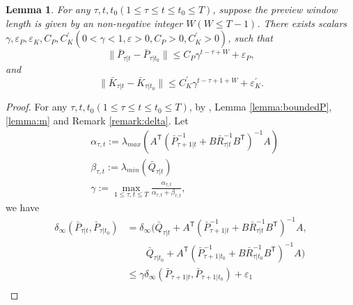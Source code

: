 \documentclass{article}
\newcommand{\transpose}{\mathsf{T}}
\newtheorem{lemma}{Lemma}
\begin{document}
\begin{lemma}\label{lemma:boundedPK}
    For any $\tau,t,t_{0}(1\leq \tau\leq t\leq t_{0}\leq T)$, suppose the preview window length is given by an non-negative integer $W(W\leq T-1)$. There exists scalars $\gamma,\varepsilon_{P},\varepsilon_{K},C_{P},C_{K}^{'}(0<\gamma<1,\varepsilon>0,C_{P}>0,C_{K}^{'}>0)$, such that
    \begin{equation}
        \|\bar{P}_{\tau|t}-\bar{P}_{\tau|t_{0}}\| \leq C_{P}\gamma^{t-\tau+W}+\varepsilon_{P},
    \end{equation}
    and
    \begin{equation}
        \|\bar{K}_{\tau|t}-\bar{K}_{\tau|t_{0}}\| \leq C_{K}^{'}\gamma^{t-\tau+1+W}+\varepsilon_{K}^{'}.
    \end{equation}
\end{lemma}
\begin{proof}
     For any $\tau,t,t_{0}(1\leq \tau\leq t\leq t_{0}\leq T)$, by \cite[Lemma D.2]{krauth_finite-time_2019}, Lemma \ref{lemma:boundedP}, \ref{lemma:m} and Remark \ref{remark:delta}. 
     Let
     \begin{align*}
        &\alpha_{\tau,t} := \lambda_{max}(A^{\transpose}(\bar{P}_{\tau+1|t}^{-1}+B\bar{R}_{\tau|t}^{-1}B^{\transpose})^{-1}A)\\
        &\beta_{\tau,t} := \lambda_{min}(\bar{Q}_{\tau|t})\\ 
        &\gamma := \max_{1\leq \tau,t \leq T} \frac{\alpha_{\tau,t}}{\alpha_{\tau,t}+\beta_{\tau,t}}, 
     \end{align*}
     we have
    \begin{align*}
        \delta_{\infty}(\bar{P}_{\tau|t},\bar{P}_{\tau|t_{0}}) &= \delta_{\infty}(\bar{Q}_{\tau|t}+A^{\transpose}(\bar{P}_{\tau+1|t}^{-1}+B\bar{R}_{\tau|t}^{-1}B^{\transpose})^{-1}A,\\
        & \qquad \bar{Q}_{\tau|t_{0}}+A^{\transpose}(\bar{P}_{\tau+1|t_{0}}^{-1}+B\bar{R}_{\tau|t_{0}}^{-1}B^{\transpose})^{-1}A)\\
        &\leq \gamma\delta_{\infty}(\bar{P}_{\tau+1|t},\bar{P}_{\tau+1|t_{0}}) + \varepsilon_{1}\\

\end{align*}
\end{proof}
\end{document}
